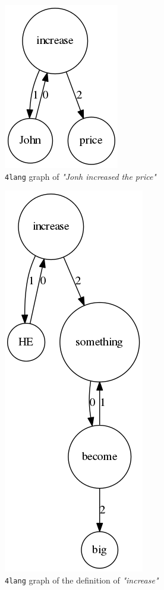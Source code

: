 \begin{figure}
	\centering
	\includegraphics[scale=0.5]{figures/thirdrule1}
	\caption{\texttt{4lang} graph of \textit{"Jonh increased the price"}}
	\label{fig:thirdrule}
\end{figure}

\begin{figure}
	\centering
	\includegraphics[scale=0.5]{figures/thirdrule2}
	\caption{\texttt{4lang} graph of the definition of \textit{"increase"}}
	\label{fig:thirdrule2}
\end{figure}

